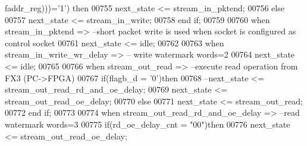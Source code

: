 \begin{DoxyCode}
{      faddr_reg}\textcolor{vhdlchar}{)}\textcolor{vhdlchar}{)}\textcolor{vhdlchar}{)}\textcolor{vhdlchar}{=}\textcolor{vhdlchar}{'}\textcolor{vhdllogic}{}\textcolor{vhdllogic}{1}\textcolor{vhdlchar}{'}\textcolor{vhdlchar}{)} \textcolor{keywordflow}{then}
00755             \textcolor{vhdlchar}{next_state} \textcolor{vhdlchar}{<=} \textcolor{vhdlchar}{stream\_in\_pktend};
00756         \textcolor{keywordflow}{else}
00757             \textcolor{vhdlchar}{next_state} \textcolor{vhdlchar}{<=} \textcolor{vhdlchar}{stream\_in\_write};
00758         \textcolor{keywordflow}{end} \textcolor{keywordflow}{if};
00759         
00760     \textcolor{keywordflow}{when} \textcolor{vhdlchar}{stream\_in\_pktend} \textcolor{vhdlchar}{=}\textcolor{vhdlchar}{>}\textcolor{keyword}{        --short packet write is used when socket is configured as control
       socket}
00761         \textcolor{vhdlchar}{next_state} \textcolor{vhdlchar}{<=} \textcolor{vhdlchar}{idle}; 
00762     
00763     \textcolor{keywordflow}{when} \textcolor{vhdlchar}{stream\_in\_write\_wr\_delay} \textcolor{vhdlchar}{=}\textcolor{vhdlchar}{>}\textcolor{keyword}{    -- write watermark words=2}
00764         \textcolor{vhdlchar}{next_state} \textcolor{vhdlchar}{<=} \textcolor{vhdlchar}{idle}; 
00765     
00766     \textcolor{keywordflow}{when} \textcolor{vhdlchar}{stream\_out\_read} \textcolor{vhdlchar}{=}\textcolor{vhdlchar}{>}\textcolor{keyword}{         --execute read operation from FX3 (PC->FPGA)}
00767         \textcolor{keywordflow}{if}\textcolor{vhdlchar}{(}\textcolor{vhdlchar}{flagb_d} \textcolor{vhdlchar}{=} \textcolor{vhdlchar}{'}\textcolor{vhdllogic}{}\textcolor{vhdllogic}{0}\textcolor{vhdlchar}{'}\textcolor{vhdlchar}{)}\textcolor{keywordflow}{then}
00768 \textcolor{keyword}{            --next\_state <= stream\_out\_read\_rd\_and\_oe\_delay;}
00769          \textcolor{vhdlchar}{next_state} \textcolor{vhdlchar}{<=} \textcolor{vhdlchar}{stream\_out\_read\_oe\_delay};
00770         \textcolor{keywordflow}{else}
00771             \textcolor{vhdlchar}{next_state} \textcolor{vhdlchar}{<=} \textcolor{vhdlchar}{stream\_out\_read};
00772         \textcolor{keywordflow}{end} \textcolor{keywordflow}{if};
00773     
00774     \textcolor{keywordflow}{when} \textcolor{vhdlchar}{stream\_out\_read\_rd\_and\_oe\_delay} \textcolor{vhdlchar}{=}\textcolor{vhdlchar}{>}\textcolor{keyword}{ --read watermark words=3}
00775         \textcolor{keywordflow}{if}\textcolor{vhdlchar}{(}\textcolor{vhdlchar}{rd_oe_delay_cnt} \textcolor{vhdlchar}{=} \textcolor{vhdllogic}{"00"}\textcolor{vhdlchar}{)}\textcolor{keywordflow}{then}
00776             \textcolor{vhdlchar}{next_state} \textcolor{vhdlchar}{<=} \textcolor{vhdlchar}{stream\_out\_read\_oe\_delay};

\end{DoxyCode}
